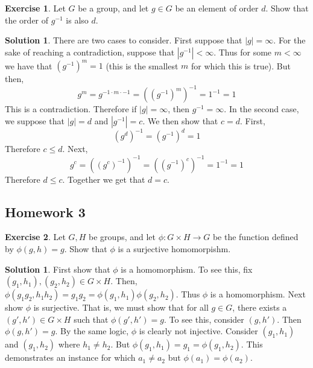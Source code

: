 \documentclass[12pt]{article}
\theoremstyle{definition}
\newtheorem{exercise}{Exercise}
\theoremstyle{definition}
\newtheorem{solution}[theorem]{Solution}
\begin{document}
\begin{exercise}
Let $G$ be a group, and let $g \in G$ be an element of order $d$. Show that the order of $g^{-1}$ is also $d$.
\end{exercise}
\begin{solution}
There are two cases to consider. First suppose that $|g| = \infty$. For the sake of reaching a contradiction, suppose that $|g^{-1}| < \infty$. Thus for some $m < \infty$ we have that $(g^{-1})^m = 1$ (this is the smallest $m$ for which this is true). But then,
\begin{equation}
	g^m = g^{-1 \cdot m \cdot -1} = ((g^{-1})^m)^{-1} = 1^{-1} = 1
\end{equation}
This is a contradiction. Therefore if $|g| = \infty$, then $g^{-1} = \infty$. In the second case, we suppose that $|g| = d$ and $|g^{-1}| = c$. We then show that $c=d$. First,
\begin{equation}
	(g^d)^{-1} = (g^{-1})^d = 1
\end{equation}
Therefore $c \leq d$. Next, 
\begin{equation}
	g^c = ((g^c)^{-1})^{-1} = ((g^{-1})^c)^{-1} = 1^{-1} = 1
\end{equation}
Therefore $d \leq c$. Together we get that $d = c$.
\end{solution}

\subsection{Homework 3}
\begin{exercise}
Let $G, H$ be groups, and let $\phi: G \times H \to G$ be the function defined by $\phi(g,h) = g$. Show that $\phi$ is a surjective homomorpishm. 
\end{exercise}
\begin{solution}
First show that $\phi$ is a homomorphism. To see this, fix $(g_1, h_1), (g_2, h_2) \in G \times H$. Then,
$\phi(g_1g_2, h_1h_2) = g_1 g_2 = \phi(g_1,h_1) \phi(g_2,h_2)$. Thus $\phi$ is a homomorphism. Next show $\phi$ is surjective. That is, we must show that for all $g \in G$, there exists a $(g', h') \in G \times H$ such that $\phi(g',h') = g$. To see this, consider $(g,h')$. Then $\phi(g,h') = g$. By the same logic, $\phi$ is clearly not injective. Consider $(g_1, h_1)$ and $(g_1, h_2)$ where $h_1 \neq h_2$. But $\phi(g_1,h_1) = g_1 = \phi(g_1, h_2)$. This demonstrates an instance for which $a_1 \neq a_2$ but $\phi(a_1) = \phi(a_2)$. 
\end{solution}
\end{document}
